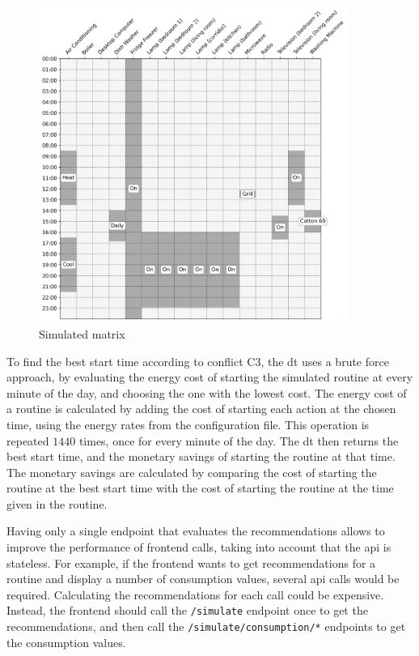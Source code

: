 \begin{figure}
    \centering
    \includegraphics[width=0.9\textwidth]{images/simulated_matrix.png}
    \caption{Simulated matrix}%
    \label{fig:simulated_consumption_matrix}
\end{figure}

To find the best start time according to conflict C3, the \acrshort{dt} uses a brute force approach, by evaluating the energy cost of starting the simulated routine at every minute of the day, and choosing the one with the lowest cost. The energy cost of a routine is calculated by adding the cost of starting each action at the chosen time, using the energy rates from the configuration file. This operation is repeated \(1440\) times, once for every minute of the day. The \acrshort{dt} then returns the best start time, and the monetary savings of starting the routine at that time. The monetary savings are calculated by comparing the cost of starting the routine at the best start time with the cost of starting the routine at the time given in the routine.

Having only a single endpoint that evaluates the recommendations allows to improve the performance of frontend calls, taking into account that the \acrshort{api} is stateless. For example, if the frontend wants to get recommendations for a routine and display a number of consumption values, several \acrshort{api} calls would be required. Calculating the recommendations for each call could be expensive. Instead, the frontend should call the \texttt{/simulate} endpoint once to get the recommendations, and then call the \texttt{/simulate/consumption/*} endpoints to get the consumption values.

